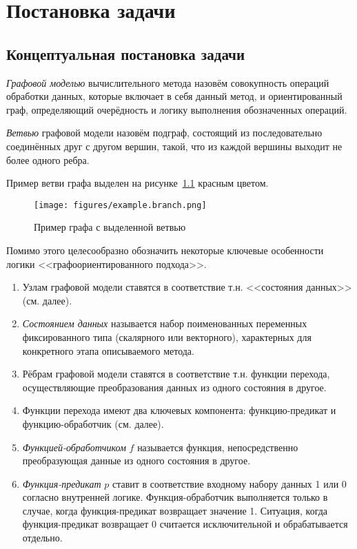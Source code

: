 \chapter{Постановка задачи}
\section{Концептуальная постановка задачи}\label{sec:concept}
\begin{definition}
    \emph{Графовой моделью} вычислительного метода назовём совокупность операций обработки данных, которые включает в себя данный метод, и ориентированный граф, определяющий очерёдность и логику выполнения обозначенных операций.
\end{definition}
\begin{definition}
    \emph{Ветвью} графовой модели назовём подграф, состоящий из последовательно соединённых друг с другом вершин, такой, что из каждой вершины выходит не более одного ребра.
\end{definition}
Пример ветви графа выделен на рисунке~\ref{fig:graphBranch} красным цветом.

\begin{figure}[H]
    \centering
    \texttt{[image: figures/example.branch.png]}
    \caption{Пример графа с выделенной ветвью}
    \label{fig:graphBranch}
\end{figure}

Помимо этого целесообразно обозначить некоторые ключевые особенности логики <<графоориентированного подхода>>.
\begin{enumerate}[1)]
    \item Узлам графовой модели ставятся в соответствие т.н. <<состояния данных>> (см. далее).
    \item \emph{Состоянием данных} называется набор поименованных переменных фиксированного типа (скалярного или векторного), характерных для конкретного этапа описываемого метода.
    \item Рёбрам графовой модели ставятся в соответствие т.н. функции перехода, осуществляющие преобразования данных из одного состояния в другое.
    \item Функции перехода имеют два ключевых компонента: функцию-предикат и функцию-обработчик (см. далее).
    \item \emph{Функцией-обработчиком} $f$ называется функция, непосредственно преобразующая данные из одного состояния в другое.
    \item \emph{Функция-предикат} $p$ ставит в соответствие входному набору данных 1 или 0 согласно внутренней логике. Функция-обработчик выполняется только в случае, когда функция-предикат возвращает значение 1. Ситуация, когда функция-предикат возвращает 0 считается исключительной и обрабатывается отдельно.
\end{enumerate}


